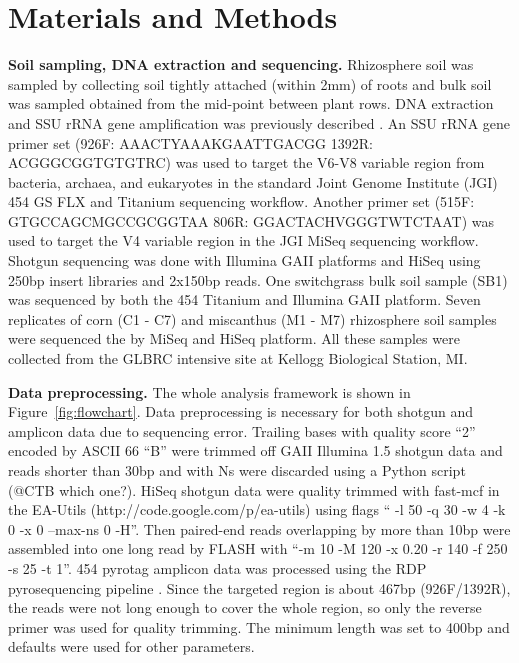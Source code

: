 \documentclass[12pt]{article}
\begin{document}
\section{Materials and Methods}

{\bf Soil sampling, DNA extraction and sequencing.} Rhizosphere soil
was sampled by collecting soil tightly attached (within 2mm) of roots
and bulk soil was sampled obtained from the mid-point between plant
rows. DNA extraction and SSU rRNA gene amplification was previously
described \cite{ed2010}. An SSU rRNA gene primer set (926F:
AAACTYAAAKGAATTGACGG 1392R: ACGGGCGGTGTGTRC) was used to target the V6-V8
variable region from bacteria, archaea, and eukaryotes in the standard Joint Genome Institute (JGI) 454 GS FLX and Titanium sequencing workflow. Another primer set (515F:
GTGCCAGCMGCCGCGGTAA 806R: GGACTACHVGGGTWTCTAAT) was used to target the V4
variable region in the JGI MiSeq sequencing workflow. Shotgun sequencing
was done with Illumina GAII platforms and HiSeq using 250bp insert
libraries and 2x150bp reads. One switchgrass bulk soil
sample (SB1) was sequenced by both the 454 Titanium and Illumina GAII
platform. Seven replicates of corn (C1 - C7) and miscanthus (M1 - M7)
rhizosphere soil samples were sequenced the by MiSeq and HiSeq
platform. All these samples were collected from the GLBRC intensive site at
Kellogg Biological Station, MI.

{\bf Data preprocessing.} The whole analysis framework is shown in
Figure~\ref{fig:flowchart}. Data preprocessing is necessary for both
shotgun and amplicon data due to sequencing error. Trailing bases with
quality score ``2'' encoded by ASCII 66 ``B'' were trimmed off GAII
Illumina 1.5 shotgun data and reads shorter than 30bp and with Ns were
discarded using a Python script (@CTB which one?). HiSeq shotgun data were quality
trimmed with fast-mcf in the EA-Utils
(http://code.google.com/p/ea-utils) using flags `` -l 50 -q 30 -w 4 -k
0 -x 0 --max-ns 0 -H''. Then paired-end reads overlapping by more than
10bp were assembled into one long read by FLASH \cite{flash2011}
with ``-m 10 -M 120 -x 0.20 -r 140 -f 250 -s 25 -t 1''. 454 pyrotag
amplicon data was processed using the RDP pyrosequencing pipeline
\cite{rdp2009}. Since the targeted region is about 467bp
(926F/1392R), the reads were not long enough to cover the whole
region, so only the reverse primer was used for quality trimming. The
minimum length was set to 400bp and defaults were used for other
parameters.
\end{document}
